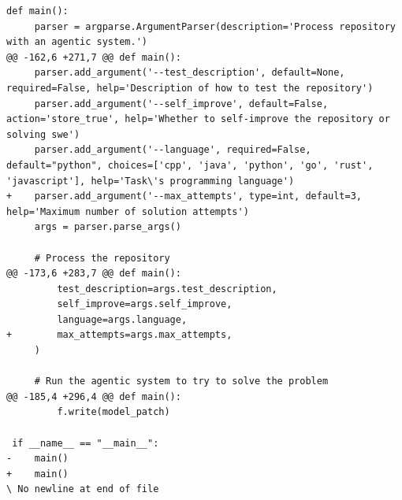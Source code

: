 \documentclass{article} %
\begin{document}
\begin{lstlisting}[style=diffstyle]
 def main():
     parser = argparse.ArgumentParser(description='Process repository with an agentic system.')
@@ -162,6 +271,7 @@ def main():
     parser.add_argument('--test_description', default=None, required=False, help='Description of how to test the repository')
     parser.add_argument('--self_improve', default=False, action='store_true', help='Whether to self-improve the repository or solving swe')
     parser.add_argument('--language', required=False, default="python", choices=['cpp', 'java', 'python', 'go', 'rust', 'javascript'], help='Task\'s programming language')
+    parser.add_argument('--max_attempts', type=int, default=3, help='Maximum number of solution attempts')
     args = parser.parse_args()
 
     # Process the repository
@@ -173,6 +283,7 @@ def main():
         test_description=args.test_description,
         self_improve=args.self_improve,
         language=args.language,
+        max_attempts=args.max_attempts,
     )
 
     # Run the agentic system to try to solve the problem
@@ -185,4 +296,4 @@ def main():
         f.write(model_patch)
 
 if __name__ == "__main__":
-    main()
+    main()
\ No newline at end of file
\end{lstlisting}
\end{document}

